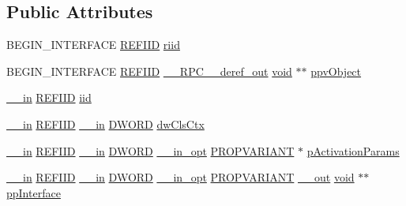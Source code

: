 \subsection*{Public Attributes}
\begin{DoxyCompactItemize}
\item 
B\+E\+G\+I\+N\+\_\+\+I\+N\+T\+E\+R\+F\+A\+CE \hyperlink{px__win__ds_8c_a80ec49c8ae61e234197d5071d2df497d}{R\+E\+F\+I\+ID} \hyperlink{struct_i_m_m_device_vtbl_ab2f2cec2a203b8979bbbc974e94e95d3}{riid}
\item 
B\+E\+G\+I\+N\+\_\+\+I\+N\+T\+E\+R\+F\+A\+CE \hyperlink{px__win__ds_8c_a80ec49c8ae61e234197d5071d2df497d}{R\+E\+F\+I\+ID} \hyperlink{rpcsal_8h_a23bc188526f10656f9c79d950f6c3192}{\+\_\+\+\_\+\+R\+P\+C\+\_\+\+\_\+deref\+\_\+out} \hyperlink{sound_8c_ae35f5844602719cf66324f4de2a658b3}{void} $\ast$$\ast$ \hyperlink{struct_i_m_m_device_vtbl_a857e5b97ff19642e248b3135fdfa26be}{ppv\+Object}
\item 
\hyperlink{sal_8h_a3f6b8655e1aa9dfc15a9029f0343009e}{\+\_\+\+\_\+in} \hyperlink{px__win__ds_8c_a80ec49c8ae61e234197d5071d2df497d}{R\+E\+F\+I\+ID} \hyperlink{struct_i_m_m_device_vtbl_a42c7e7f04789467eff9b233961aff297}{iid}
\item 
\hyperlink{sal_8h_a3f6b8655e1aa9dfc15a9029f0343009e}{\+\_\+\+\_\+in} \hyperlink{px__win__ds_8c_a80ec49c8ae61e234197d5071d2df497d}{R\+E\+F\+I\+ID} \hyperlink{sal_8h_a3f6b8655e1aa9dfc15a9029f0343009e}{\+\_\+\+\_\+in} \hyperlink{mapinls_8h_ad342ac907eb044443153a22f964bf0af}{D\+W\+O\+RD} \hyperlink{struct_i_m_m_device_vtbl_aab61606af876c92134df0c5bf744cf6c}{dw\+Cls\+Ctx}
\item 
\hyperlink{sal_8h_a3f6b8655e1aa9dfc15a9029f0343009e}{\+\_\+\+\_\+in} \hyperlink{px__win__ds_8c_a80ec49c8ae61e234197d5071d2df497d}{R\+E\+F\+I\+ID} \hyperlink{sal_8h_a3f6b8655e1aa9dfc15a9029f0343009e}{\+\_\+\+\_\+in} \hyperlink{mapinls_8h_ad342ac907eb044443153a22f964bf0af}{D\+W\+O\+RD} \hyperlink{sal_8h_a9c2d0f2980e51b51bb405ee2a31a3353}{\+\_\+\+\_\+in\+\_\+opt} \hyperlink{propidl_8h_ae902c1757cd16052896846fa4ebb88d8}{P\+R\+O\+P\+V\+A\+R\+I\+A\+NT} $\ast$ \hyperlink{struct_i_m_m_device_vtbl_a3619d9ea44a532a61cbef9cfd2dacd6a}{p\+Activation\+Params}
\item 
\hyperlink{sal_8h_a3f6b8655e1aa9dfc15a9029f0343009e}{\+\_\+\+\_\+in} \hyperlink{px__win__ds_8c_a80ec49c8ae61e234197d5071d2df497d}{R\+E\+F\+I\+ID} \hyperlink{sal_8h_a3f6b8655e1aa9dfc15a9029f0343009e}{\+\_\+\+\_\+in} \hyperlink{mapinls_8h_ad342ac907eb044443153a22f964bf0af}{D\+W\+O\+RD} \hyperlink{sal_8h_a9c2d0f2980e51b51bb405ee2a31a3353}{\+\_\+\+\_\+in\+\_\+opt} \hyperlink{propidl_8h_ae902c1757cd16052896846fa4ebb88d8}{P\+R\+O\+P\+V\+A\+R\+I\+A\+NT} \hyperlink{sal_8h_abb4c3c1135aab6c47cff22e7c16efb74}{\+\_\+\+\_\+out} \hyperlink{sound_8c_ae35f5844602719cf66324f4de2a658b3}{void} $\ast$$\ast$ \hyperlink{struct_i_m_m_device_vtbl_ac016cb0f93ad54c50ddc2d8e81469a15}{pp\+Interface}

\end{DoxyCompactItemize}
